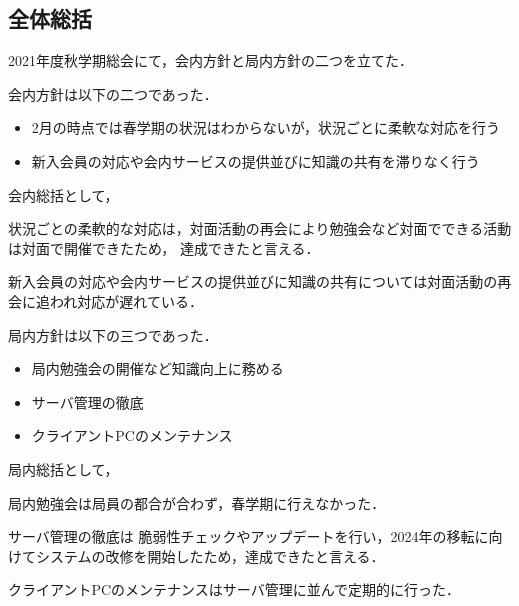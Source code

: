 \subsection*{全体総括}


2021年度秋学期総会にて，会内方針と局内方針の二つを立てた．

会内方針は以下の二つであった．
\begin{itemize}
  \item 2月の時点では春学期の状況はわからないが，状況ごとに柔軟な対応を行う
  \item 新入会員の対応や会内サービスの提供並びに知識の共有を滞りなく行う
\end{itemize}
会内総括として，

状況ごとの柔軟的な対応は，対面活動の再会により勉強会など対面でできる活動は対面で開催できたため，
達成できたと言える．

新入会員の対応や会内サービスの提供並びに知識の共有については対面活動の再会に追われ対応が遅れている．

局内方針は以下の三つであった．
\begin{itemize}
  \item 局内勉強会の開催など知識向上に務める
  \item サーバ管理の徹底
  \item クライアントPCのメンテナンス
\end{itemize}
局内総括として，

局内勉強会は局員の都合が合わず，春学期に行えなかった．

サーバ管理の徹底は
脆弱性チェックやアップデートを行い，2024年の移転に向けてシステムの改修を開始したため，達成できたと言える．

クライアントPCのメンテナンスはサーバ管理に並んで定期的に行った．
